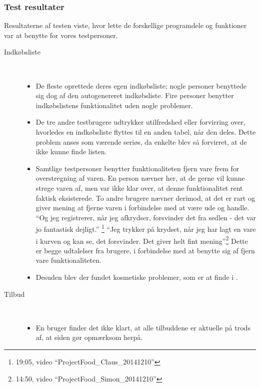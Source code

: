 \subsubsection{Test resultater}\label{ss:bt2}
Resultaterne af testen viste, hvor lette de forskellige programdele og funktioner var at benytte for vores testpersoner.
\begin{description}
   \item[Indkøbsliste]\hfill\\
   \vspace{-15pt}
   \begin{itemize}[nolistsep, noitemsep]
      \item De fleste oprettede deres egen indkøbsliste; nogle personer benyttede sig dog af den autogenereret indkøbsliste. 
      Fire personer benytter indkøbslistens funktionalitet uden nogle problemer.
      \item De tre andre testbrugere udtrykker utilfredshed eller forvirring over, hvorledes en indkøbsliste flyttes til en anden tabel, når den deles.
      Dette problem anses som værende seriøs, da enkelte blev så forvirret, at de ikke kunne finde listen. 
      \item Samtlige testpersoner benytter funktionaliteten fjern vare frem for overstregning af varen. 
      En person nævner her, at de gerne vil kunne strege varen af, men var ikke klar over, at denne funktionalitet rent faktisk eksisterede.
      To andre brugere nævner derimod, at det er rart og giver mening at fjerne varen i forbindelse med at være ude og handle.
      ``Og jeg registrerer, når jeg afkrydser, forsvinder det fra sedlen - det var jo fantastisk dejligt.'' \footnote{19:05, video ``ProjectFood\_Claus\_20141210''}
      ``Jeg trykker på krydset, når jeg har lagt en vare i kurven og kan se, det forsvinder. Det giver helt fint mening''\footnote{14:50, video ``ProjectFood\_Simon\_20141210''}
      Dette er begge udtalelser fra brugere, i forbindelse med at benytte sig af fjern vare funktionaliteten.
      \item Desuden blev der fundet kosmetiske problemer, som er at finde i .
   \end{itemize}
   \item[Tilbud]\hfill\\
   \vspace{-15pt}
   \begin{itemize}[nolistsep, noitemsep]
      \item En bruger finder det ikke klart, at alle tilbuddene er aktuelle på trods af, at siden gør opmærksom herpå.

\end{itemize}
\end{description}
